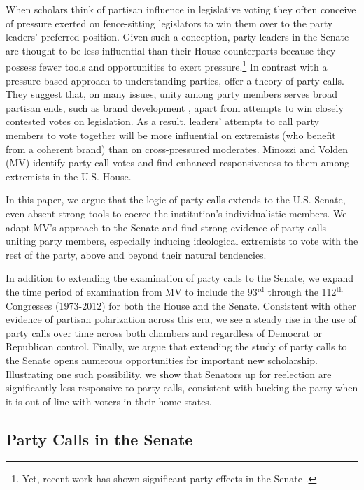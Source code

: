 \documentclass[12pt]{article}
\begin{document}
\noindent When scholars think of partisan influence in legislative voting they often conceive of pressure exerted on fence-sitting legislators to win them over to the party leaders' preferred position.  Given such a conception, party leaders in the Senate are thought to be less influential than their House counterparts because they possess fewer tools and opportunities to exert pressure.\footnote{\doublespacing\normalsize Yet, recent work has shown significant party effects in the Senate \citep[e.g.,][]{Gailmard:2007, Monroe:2008, Patty:2008, Volden:2006}.}  In contrast with a pressure-based approach to understanding parties, \cite{Minozzi:2013} offer a theory of party calls.  They suggest that, on many issues, unity among party members serves broad partisan ends, such as brand development \citep[e.g.,][]{Snyder:2002}, apart from attempts to win closely contested votes on legislation.  As a result, leaders' attempts to call party members to vote together will be more influential on extremists (who benefit from a coherent brand) than on cross-pressured moderates.  Minozzi and Volden (MV) identify party-call votes and find enhanced responsiveness to them among extremists in the U.S. House.

In this paper, we argue that the logic of party calls extends to the U.S. Senate, even absent strong tools to coerce the institution's individualistic members.  We adapt MV's approach to the Senate and find strong evidence of party calls uniting party members, especially inducing ideological extremists to vote with the rest of the party, above and beyond their natural tendencies.

In addition to extending the examination of party calls to the Senate, we expand the time period of examination from MV to include the 93$^{\text{rd}}$ through the 112$^{\text{th}}$ Congresses (1973-2012) for both the House and the Senate. Consistent with other evidence of partisan polarization across this era, we see a steady rise in the use of party calls over time across both chambers and regardless of Democrat or Republican control. Finally, we argue that extending the study of party calls to the Senate opens numerous opportunities for important new scholarship.  Illustrating one such possibility, we show that Senators up for reelection are significantly less responsive to party calls, consistent with bucking the party when it is out of line with voters in their home states.


\subsection*{Party Calls in the Senate}
\end{document}
